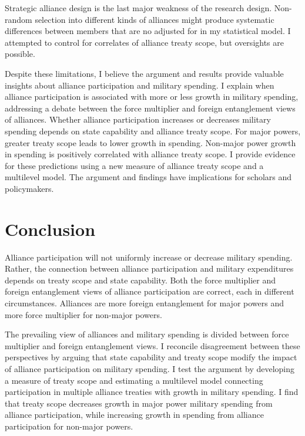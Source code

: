 \documentclass[12pt]{article}
\begin{document}
Strategic alliance design is the last major weakness of the research design. 
Non-random selection into different kinds of alliances might produce systematic differences between members that are no adjusted for in my statistical model. 
I attempted to control for correlates of alliance treaty scope, but oversights are possible. 


Despite these limitations, I believe the argument and results provide valuable insights about alliance participation and military spending. 
I explain when alliance participation is associated with more or less growth in military spending, addressing a debate between the force multiplier and foreign entanglement views of alliances. 
Whether alliance participation increases or decreases military spending depends on state capability and alliance treaty scope. 
For major powers, greater treaty scope leads to lower growth in spending. 
Non-major power growth in spending is positively correlated with alliance treaty scope. 
I provide evidence for these predictions using a new measure of alliance treaty scope and a multilevel model. 
The argument and findings have implications for scholars and policymakers. 



\section{Conclusion}

Alliance participation will not uniformly increase or decrease military spending. 
Rather, the connection between alliance participation and military expenditures depends on treaty scope and state capability.  
Both the force multiplier and foreign entanglement views of alliance participation are correct, each in different circumstances.
Alliances are more foreign entanglement for major powers and more force multiplier for non-major powers.


The prevailing view of alliances and military spending is divided between force multiplier and foreign entanglement views. 
I reconcile disagreement between these perspectives by arguing that state capability and treaty scope modify the impact of alliance participation on military spending. 
I test the argument by developing a measure of treaty scope and estimating a multilevel model connecting participation in multiple alliance treaties with growth in military spending. 
I find that treaty scope decreases growth in major power military spending from alliance participation, while increasing growth in spending from alliance participation for non-major powers. 
 
\end{document}
